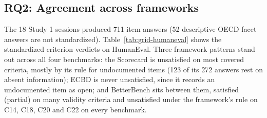 \documentclass[10pt,conference]{IEEEtran}
\begin{document}
\subsection{RQ2: Agreement across frameworks}
\label{sec:rq2}
The 18 Study 1 sessions produced 711 item answers (52 descriptive OECD facet answers are not standardized). Table~\ref{tab:grid-humaneval} shows the standardized criterion verdicts on HumanEval. Three framework patterns stand out across all four benchmarks: the Scorecard is unsatisfied on most covered criteria, mostly by its rule for undocumented items (123 of its 272 answers rest on absent information); ECBD is never unsatisfied, since it records an undocumented item as open; and BetterBench sits between them, satisfied (partial) on many validity criteria and unsatisfied under the framework's rule on C14, C18, C20 and C22 on every benchmark.
\end{document}

